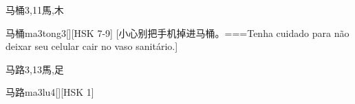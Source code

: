 \begin{Entry}{马桶}{3,11}{⾺,⽊}
  \begin{Phonetics}{马桶}{ma3tong3}[][HSK 7-9]
    [小心别把手机掉进马桶。===Tenha cuidado para não deixar seu celular cair no vaso sanitário.]
  \end{Phonetics}
\end{Entry}

\begin{Entry}{马路}{3,13}{⾺,⾜}
  \begin{Phonetics}{马路}{ma3lu4}[][HSK 1]
  \end{Phonetics}
\end{Entry}


